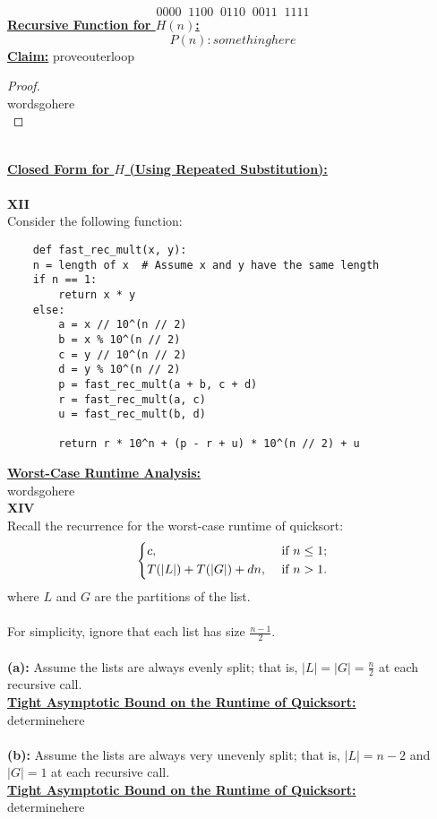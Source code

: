 \documentclass[12pt]{article}
\begin{document}
\[
0000 \;\; 1100 \;\; 0110 \;\; 0011 \;\; 1111
\]
\textbf{\underline{Recursive Function for $H(n)$:}} \\
\[P(n): somethinghere\]
\textbf{\underline{Claim:}} proveouterloop
\begin{proof}
\leavevmode\\
    wordsgohere \\
\end{proof}
\leavevmode\\
\textbf{\underline{Closed Form for $H$ (Using Repeated Substitution):}} \\
\\
\textbf{XII} \\
Consider the following function:
\begin{lstlisting}
    def fast_rec_mult(x, y):
    n = length of x  # Assume x and y have the same length
    if n == 1:
        return x * y
    else:
        a = x // 10^(n // 2)
        b = x % 10^(n // 2)
        c = y // 10^(n // 2)
        d = y % 10^(n // 2)
        p = fast_rec_mult(a + b, c + d)
        r = fast_rec_mult(a, c)
        u = fast_rec_mult(b, d)

        return r * 10^n + (p - r + u) * 10^(n // 2) + u
\end{lstlisting}
\textbf{\underline{Worst-Case Runtime Analysis:}} \\
wordsgohere
\\
\textbf{XIV} \\
Recall the recurrence for the worst-case runtime of quicksort:
\[ \begin{dcases}
    c, &\text{ if } n \leq 1; \\
    T(|L|) + T(|G|) + dn, &\text{ if } n > 1.
\end{dcases}
\] where $L$ and $G$ are the partitions of the list. \\
\\
For simplicity, ignore that each list has size \(\frac{n-1}{2}\). \\
\\
\textbf{(a):} Assume the lists are always evenly split; that is, \(|L| = |G| = \frac{n}{2}\) at each recursive call. \\
\textbf{\underline{Tight Asymptotic Bound on the Runtime of Quicksort:}} \\
determinehere \\
\\
\textbf{(b):} Assume the lists are always very unevenly split; that is, \(|L| = n - 2\) and \(|G| = 1\) at each recursive call. \\
\textbf{\underline{Tight Asymptotic Bound on the Runtime of Quicksort:}} \\
determinehere \\
\\
\end{document}
